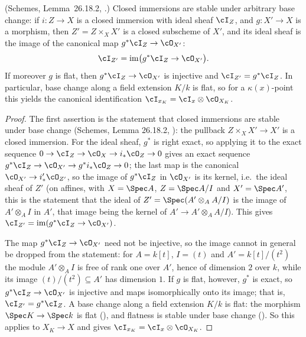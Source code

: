 \begin{lemma}
\label{lem:pc-closed-imm-base-change}
(Schemes, Lemma~26.18.2,
.)  Closed immersions
are stable under arbitrary base change: if $i:Z\to X$ is a closed
immersion with ideal sheaf $\cI_Z$, and $g:X'\to X$ is a morphism, then
$Z'=Z\times_XX'$ is a closed subscheme of $X'$, and its ideal sheaf is
the image of the canonical map $g^*\cI_Z\to\cO_{X'}$:
\[
\cI_{Z'}=\operatorname{im}\bigl(g^*\cI_Z\to\cO_{X'}\bigr).
\]
If moreover $g$ is flat, then $g^*\cI_Z\to\cO_{X'}$ is injective and
$\cI_{Z'}=g^*\cI_Z$.  In particular, base change along a field
extension $K/k$ is flat, so for a $\kappa(x)$-point this yields the
canonical identification $\cI_{x_K}=\cI_x\otimes\cO_{X_K}$.
\end{lemma}
\begin{proof}
The first assertion is the statement that closed immersions are stable
under base change (Schemes, Lemma 26.18.2,
): the pullback
$Z\times_XX'\to X'$ is a closed immersion.  For the ideal sheaf, $g^*$
is right exact, so applying it to the exact
sequence $0\to\cI_Z\to\cO_X\to i_*\cO_Z\to0$ gives an exact sequence
$g^*\cI_Z\to\cO_{X'}\to g^*i_*\cO_Z\to0$; the last map is the canonical
$\cO_{X'}\to i'_*\cO_{Z'}$, so the image of $g^*\cI_Z$ in $\cO_{X'}$ is
its kernel, i.e.\ the ideal sheaf of $Z'$ (on affines, with $X=\Spec A$,
$Z=\Spec A/I$ and $X'=\Spec A'$, this is the statement that the ideal of
$Z'=\Spec(A'\otimes_AA/I)$ is the image of $A'\otimes_AI$ in $A'$, that
image being the kernel of $A'\to A'\otimes_AA/I$).  This gives
$\cI_{Z'}=\operatorname{im}(g^*\cI_Z\to\cO_{X'})$.

The map $g^*\cI_Z\to\cO_{X'}$ need not be injective, so the image
cannot in general be dropped from the statement: for $A=k[t]$, $I=(t)$
and $A'=k[t]/(t^2)$ the module $A'\otimes_AI$ is free of rank one over
$A'$, hence of dimension $2$ over $k$, while its image
$(t)/(t^2)\subseteq A'$ has dimension $1$.  If $g$ is flat, however,
$g^*$ is exact, so $g^*\cI_Z\to\cO_{X'}$ is injective and maps
isomorphically onto its image; that is, $\cI_{Z'}=g^*\cI_Z$.  A base
change along a field extension $K/k$ is flat: the morphism
$\Spec K\to\Spec k$ is flat (), and flatness is
stable under base change ().  So
this applies to $X_K\to X$ and gives $\cI_{x_K}=\cI_x\otimes\cO_{X_K}$.
\end{proof}

